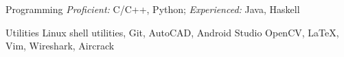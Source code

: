 \begin{cvskills}

  \cvskill
  {Programming}
  {\textit{Proficient: } C/C++, Python; \hspace{0.3cm}
    \textit{Experienced: } Java, Haskell}

  \cvskill
  {Utilities}
  {Linux shell utilities, Git, AutoCAD, Android Studio
     OpenCV, \LaTeX, Vim, Wireshark, Aircrack}

\end{cvskills}

